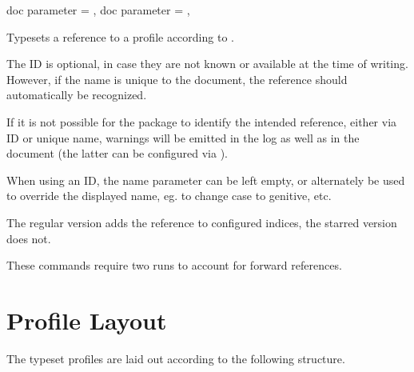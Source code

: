\documentclass[
	a4paper,
]{article}
\begin{document}
\begin{docCommands}[
		doc name = {gprRef}
	]
	{
		{ doc parameter = {}},
		{ doc parameter = {\sarg{}}},
	}

	Typesets a reference to a profile according to .

	The ID is optional, in case they are not known or available at the time of writing. However, if the name is unique to the document, the reference should automatically be recognized.

	If it is not possible for the package to identify the intended reference, either via ID or unique name, warnings will be emitted in the log as well as in the document (the latter can be configured via ).

	When using an ID, the name parameter can be left empty, or alternately be used to override the displayed name, eg. to change case to genitive, etc.

	The regular version adds the reference to configured indices, the starred version does not.

	These commands require two runs to account for forward references.
\end{docCommands}


\section{Profile Layout} %

\label{sec:structure}
The typeset profiles are laid out according to the following structure.
\end{document}
